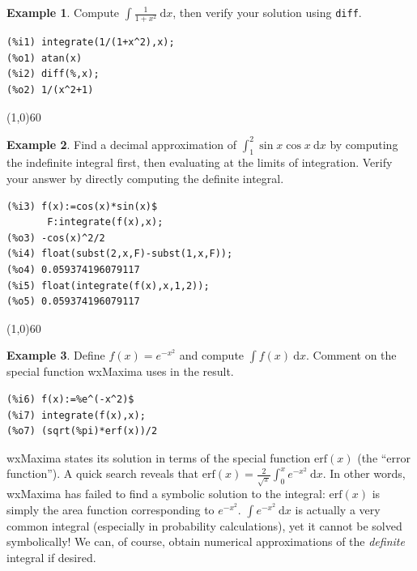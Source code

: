 \documentclass[10.5pt,twoside]{report}
\theoremstyle{definition}
\newtheorem{exmp}{Example}[section]
\begin{document}
\begin{exmp} Compute $\displaystyle \int \frac{1}{1+x^2} \ \mathrm{d}x$, then verify your solution using \verb|diff|.  

\begin{verbatim}
(%i1) integrate(1/(1+x^2),x);
(%o1) atan(x)
(%i2) diff(%,x);
(%o2) 1/(x^2+1)
\end{verbatim}

\end{exmp}

\line(1,0){60}
\linethickness{0.5mm}



\begin{exmp} Find a decimal approximation of $\displaystyle \int_{1}^{2} \sin{x} \cos{x} \ \mathrm{d} x$ by computing the indefinite integral first, then evaluating at the limits of integration.  Verify your answer by directly computing the definite integral.\\

\begin{verbatim}
(%i3) f(x):=cos(x)*sin(x)$
       F:integrate(f(x),x);
(%o3) -cos(x)^2/2
(%i4) float(subst(2,x,F)-subst(1,x,F));
(%o4) 0.059374196079117
(%i5) float(integrate(f(x),x,1,2));
(%o5) 0.059374196079117
\end{verbatim}


\end{exmp}

\line(1,0){60}
\linethickness{0.5mm}


\begin{exmp}  Define $f(x)=e^{-x^2}$ and compute $\displaystyle \int f(x) \ \mathrm{d}x$.  Comment on the special function wxMaxima uses in the result.

\begin{verbatim}
(%i6) f(x):=%e^(-x^2)$
(%i7) integrate(f(x),x);
(%o7) (sqrt(%pi)*erf(x))/2
\end{verbatim}

wxMaxima states its solution in terms of the special function $\mathrm{erf}(x)$ (the ``error function'').  A quick search reveals that $\mathrm{erf}(x)=\frac{2}{\sqrt{\pi}} \displaystyle \int_{0}^{x} e^{-x^2} \ \mathrm{d}x$.  In other words, wxMaxima has failed to find a symbolic solution to the integral: $\mathrm{erf}(x)$ is simply the area function corresponding to $e^{-x^2}$.  $\displaystyle \int e^{-x^2} \ \mathrm{d}x$ is actually a very common integral (especially in probability calculations), yet it cannot be solved symbolically!  We can, of course, obtain numerical approximations of the \textit{definite} integral if desired.


\end{exmp}
\end{document}
